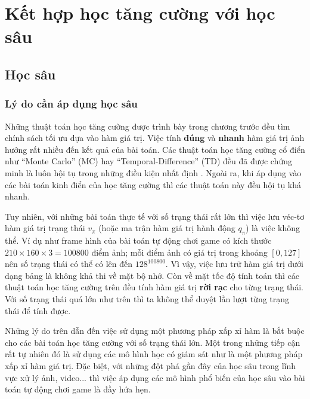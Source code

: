 \section{Kết hợp học tăng cường với học sâu}

\subsection{Học sâu}
\subsubsection*{Lý do cần áp dụng học sâu}
	Những thuật toán học tăng cường được trình bày trong chương trước đều tìm chính sách tối ưu dựa vào hàm giá trị. 
	Việc tính \textbf{đúng} và \textbf{nhanh} hàm giá trị ảnh hưởng rất nhiều đến kết quả của bài toán. 
	Các thuật toán học tăng cường cổ điển như ``Monte Carlo'' (MC) hay ``Temporal-Difference'' (TD) đều đã được chứng minh là luôn hội tụ trong những điều kiện nhất định \cite{sutton1998introduction}. 
	Ngoài ra, khi áp dụng vào các bài toán kinh điển của học tăng cường thì các thuật toán này đều hội tụ khá nhanh.
	
	Tuy nhiên, với những bài toán thực tế với số trạng thái rất lớn thì việc lưu véc-tơ hàm giá trị trạng thái $v_{\pi}$ (hoặc ma trận hàm giá trị hành động $q_{\pi}$) là việc không thể. 
	Ví dụ như frame hình của bài toán tự động chơi game có kích thước $210\times160\times3=100800$ điểm ảnh; mỗi điểm ảnh có giá trị trong khoảng $[0, 127]$ nên số trạng thái có thể có lên đến $128^{100800}$.
	Vì vậy, việc lưu trữ hàm giá trị dưới dạng bảng là không khả thi về mặt bộ nhớ.
	Còn về mặt tốc độ tính toán thì các thuật toán học tăng cường trên đều tính hàm giá trị \textbf{rời rạc} cho từng trạng thái.
	Với số trạng thái quá lớn như trên thì ta không thể duyệt lần lượt từng trạng thái để tính được.
	
	Những lý do trên dẫn đến việc sử dụng một phương pháp xấp xỉ hàm là bắt buộc cho các bài toán học tăng cường với số trạng thái lớn.
	Một trong những tiếp cận rất tự nhiên đó là sử dụng các mô hình học có giám sát như là một phương pháp xấp xỉ hàm giá trị.
	Đặc biệt, với những đột phá gần đây của học sâu trong lĩnh vực xử lý ảnh, video... \cite{lecun2015deep} thì việc áp dụng các mô hình phổ biến của học sâu vào bài toán tự động chơi game là đầy hứa hẹn.
	
